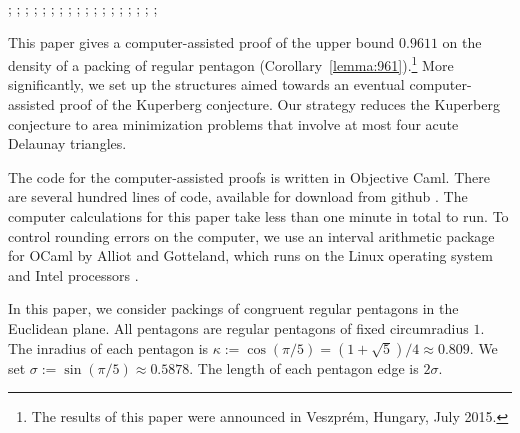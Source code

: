 {
;  %
;  %
;  
;  %
; 
;  
;  
;  %
; 
;  
;  
;  %
;  %
; 
;  %
; 
;  
;   
}



This paper gives a computer-assisted proof of the upper
bound $0.9611$ on the density of a packing of
regular pentagon
(Corollary~\ref{lemma:961}).{\let\thefootnote\relax\footnote{The
    results of this paper were announced in 
Veszpr\'em, Hungary, July 2015.}}
More significantly, we set up the structures aimed
towards an eventual computer-assisted proof of the Kuperberg
conjecture.  Our strategy reduces the Kuperberg conjecture to 
area minimization problems that involve at most four acute Delaunay triangles.

\begin{remark}\label{rem:interval}
  The code for the computer-assisted proofs is written in Objective
  Caml.  There are several hundred lines of code, available for
  download from github \cite{Git}.  The computer calculations for this
  paper take less than one minute in total to run.  To control
  rounding errors on the computer, we use an interval arithmetic
  package for OCaml by Alliot and Gotteland, which runs on the Linux
  operating system and Intel processors \cite{All}.
\end{remark}


In this paper, we consider packings of congruent regular pentagons in
the Euclidean plane.  All pentagons are regular pentagons of fixed
circumradius $1$.  The inradius of each pentagon is $\kappa:= \cos
(\pi/5) = (1+\sqrt{5})/4 \approx 0.809$. We set $\sigma := \sin(\pi/5)
\approx 0.5878$.  The length of each pentagon edge is $2\sigma$.

